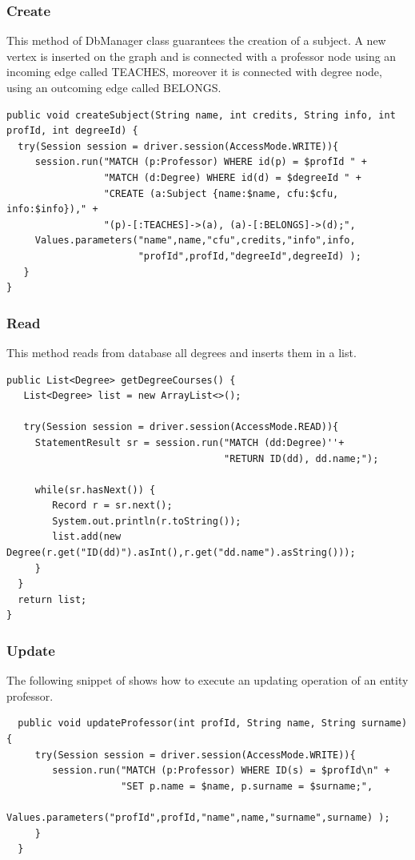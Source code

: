 \documentclass[a4paper]{article}
\begin{document}
\subsubsection{Create}
This method of DbManager class guarantees the creation of a subject. A new vertex is inserted on the graph and  is connected with a professor node using an incoming edge called TEACHES, moreover it is connected with degree node, using an outcoming edge called BELONGS.

\begin{verbatim}
public void createSubject(String name, int credits, String info, int profId, int degreeId) {
  try(Session session = driver.session(AccessMode.WRITE)){
     session.run("MATCH (p:Professor) WHERE id(p) = $profId " + 
                 "MATCH (d:Degree) WHERE id(d) = $degreeId " +
                 "CREATE (a:Subject {name:$name, cfu:$cfu, info:$info})," +
                 "(p)-[:TEACHES]->(a), (a)-[:BELONGS]->(d);", 
     Values.parameters("name",name,"cfu",credits,"info",info,
                       "profId",profId,"degreeId",degreeId) );
   }
}
\end{verbatim}


\subsubsection{Read}
This method reads from database all degrees and inserts them in a list.

\begin{verbatim}
public List<Degree> getDegreeCourses() {
   List<Degree> list = new ArrayList<>();
 
   try(Session session = driver.session(AccessMode.READ)){
     StatementResult sr = session.run("MATCH (dd:Degree)''+
                                      "RETURN ID(dd), dd.name;");

     while(sr.hasNext()) {
        Record r = sr.next();
        System.out.println(r.toString());
        list.add(new Degree(r.get("ID(dd)").asInt(),r.get("dd.name").asString()));
     }
  }
  return list;
}
\end{verbatim}


\subsubsection{Update}
The following snippet of shows how to execute an updating operation of an entity professor.
\begin{verbatim}
  public void updateProfessor(int profId, String name, String surname) {
     try(Session session = driver.session(AccessMode.WRITE)){
        session.run("MATCH (p:Professor) WHERE ID(s) = $profId\n" + 
                    "SET p.name = $name, p.surname = $surname;",
        Values.parameters("profId",profId,"name",name,"surname",surname) );
     }
  }
\end{verbatim}
\end{document}
